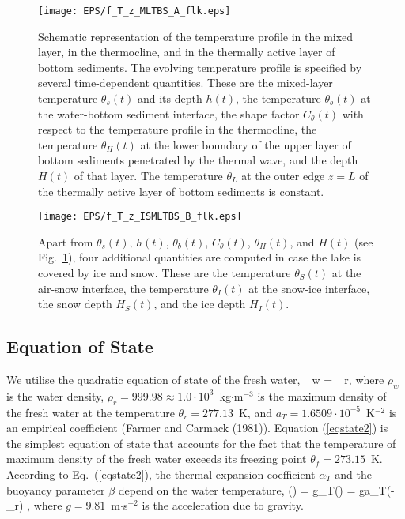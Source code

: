 %
\begin{figure} %
\begin{center}
\texttt{[image: EPS/f\_T\_z\_MLTBS\_A\_flk.eps]}
\begin{minipage}{0.9\textwidth}
\caption{Schematic representation of the temperature profile
in the mixed layer, in the thermocline, 
and in the thermally active layer of bottom sediments.
The evolving temperature profile is specified by several time-dependent quantities. 
These are 
the mixed-layer temperature $\theta_s(t)$ and its depth $h(t)$,
the temperature $\theta_b(t)$ at the water-bottom sediment interface,
the shape factor $C_{\theta}(t)$ with respect to the temperature profile in the thermocline,
the temperature $\theta_H(t)$ at the lower boundary of the upper layer of bottom sediments
penetrated by the thermal wave, and the depth $H(t)$ of that layer.
The temperature $\theta_{L}$ at the outer edge $z=L$
of the thermally active layer of bottom sediments is constant.}
\label{ftr_T_sch_2media}
\end{minipage}
\end{center}
\end{figure}
%
%
\begin{figure} %
\begin{center}
\texttt{[image: EPS/f\_T\_z\_ISMLTBS\_B\_flk.eps]}
\begin{minipage}{0.9\textwidth}
\caption{
Apart from $\theta_s(t)$, $h(t)$, $\theta_b(t)$, $C_{\theta}(t)$, $\theta_H(t)$, and $H(t)$   
(see Fig.~\ref{ftr_T_sch_2media}), 
four additional quantities are computed in case the lake is covered by ice and snow. 
These are 
the temperature $\theta_S(t)$ at the air-snow interface,
the temperature $\theta_I(t)$ at the snow-ice interface,
the snow depth $H_S(t)$, and the ice depth $H_I(t)$.}
\label{ftr_T_sch_4media}
\end{minipage}
\end{center}
\end{figure}
%


\subsection{Equation of State}\label{eqstate}
\nopagebreak 
%
\noindent
We utilise the quadratic equation of state of the fresh water, 
%
\beq\label{eqstate2}
\rho_w = \rho_r ,
\eeq
%
where $\rho_w$ is the water density, 
$\rho_r=999.98\approx1.0\cdot10^3$~kg$\cdot$m$^{-3}$ is the maximum density 
of the fresh water at the temperature $\theta_r=277.13$~K, 
and $a_T=1.6509\cdot 10^{-5}$~K$^{-2}$ is an empirical 
coefficient (Farmer and Carmack (1981)\nocite{farmer1981}). 
Equation (\ref{eqstate2}) is the simplest equation of state that 
accounts for the fact that the temperature of maximum density of 
the fresh water exceeds its freezing point 
$\theta_f=273.15$~K. 
According to Eq.~(\ref{eqstate2}), 
the thermal expansion coefficient 
$\alpha_T$ and the buoyancy parameter $\beta$ 
depend on the water temperature, 
%
\beq\label{buopar}
\beta(\theta) = g\alpha_T(\theta) = ga_T(\theta-\theta_r) ,
\eeq
%
where $g=9.81$~m$\cdot$s$^{-2}$ is the acceleration due to gravity.


